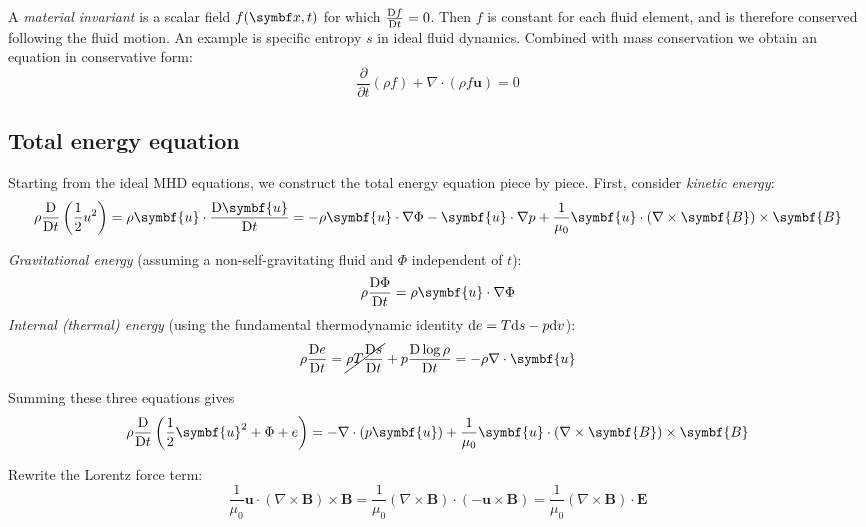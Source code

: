 \documentclass{jknotes}
\newcommand{\B}{\symbf{B}}
\renewcommand{\u}{\symbf{u}}
\begin{document}
A \emph{material invariant} is a scalar field $f(\x,t)$ for which
$\frac{\mathrm{D} f}{\mathrm{D} t} = 0$. Then $f$ is constant for each fluid element,
and is therefore conserved following the fluid motion. An example is specific
entropy $s$ in ideal fluid dynamics. Combined with mass conservation we obtain
an equation in conservative form:
\begin{equation}
	\frac{\partial}{\partial t}(\rho f) + \nabla \cdot (\rho f \u) = 0
\end{equation}

\subsection{Total energy equation}
Starting from the ideal MHD equations, we construct the total energy equation
piece by piece. First, consider \emph{kinetic energy}:
\begin{equation}
	\rho \frac{\diffD}{\diffD t}\left( \frac{1}{2}u^2\right) = \rho \u \cdot
	\frac{\diffD \u}{\diffD t} = - \rho \u \cdot \nabla \Phi - \u \cdot \nabla
	p + \frac{1}{\mu_0} \u \cdot (\nabla \times \B) \times \B
\end{equation}

\emph{Gravitational energy} (assuming a non-self-gravitating fluid and $\Phi$
independent of $t$):
\begin{equation}
	\rho \frac{\diffD \Phi}{\diffD t} = \rho \u \cdot \nabla \Phi
\end{equation}
\emph{Internal (thermal) energy} (using the fundamental thermodynamic identity
$\diffd e = T \diffd s - p \diffd v$):
\begin{equation}
	\rho \frac{\diffD e}{\diffD t} = \cancel{\rho T \frac{\diffD s}{\diffD t}}
	+ p \frac{\diffD \log \rho}{\diffD t} = - \rho \nabla \cdot \u
\end{equation}

Summing these three equations gives
\begin{equation}
	\rho \frac{\diffD}{\diffD t} \left( \frac{1}{2}\u^2 + \Phi + e\right) = -
	\nabla \cdot (p \u) + \frac{1}{\mu_0} \u \cdot (\nabla \times \B) \times
	\B
\end{equation}

Rewrite the Lorentz force term:
\begin{equation}
	\frac{1}{\mu_0} \u \cdot (\nabla \times \B) \times \B = \frac{1}{\mu_0}
	(\nabla \times \B) \cdot (-\u \times \B) = \frac{1}{\mu_0} (\nabla \times
	\B) \cdot \symbf{E}
\end{equation}
\end{document}
